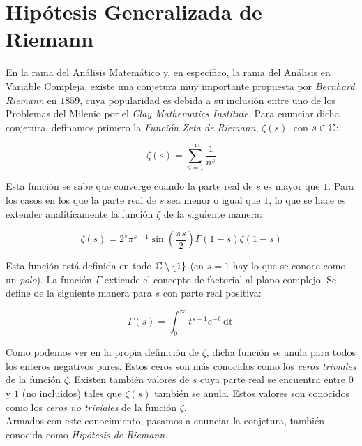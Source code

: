 \section{Hipótesis Generalizada de Riemann}

En la rama del Análisis Matemático y, en específico, la rama del Análisis en Variable Compleja, existe una conjetura muy importante propuesta por \textit{Bernhard Riemann} en $1859$, cuya popularidad es debida a su inclusión entre uno de los Problemas del Milenio por el \textit{Clay Mathematics Institute}. Para enunciar dicha conjetura, definamos primero la \textit{Función Zeta de Riemann}, $\zeta(s)$, con $s \in \mathbb{C}$:

\begin{equation}\label{funcion_zeta_de_riemann}
\zeta(s) = \sum_{n=1}^{\infty}\frac{1}{n^s}
\end{equation}

Esta función se sabe que converge cuando la parte real de $s$ es mayor que $1$. Para los casos en los que la parte real de $s$ sea menor o igual que $1$, lo que se hace es extender analíticamente la función $\zeta$ de la siguiente manera:

\begin{equation}\label{funcion_zeta_de_riemann_extendida}
\zeta(s) = 2^s\pi^{s-1}\sin\left(\frac{\pi s}{2}\right)\Gamma(1-s)\zeta(1-s)
\end{equation}

Esta función está definida en todo $\mathbb{C} \setminus \{1\}$ (en $s = 1$ hay lo que se conoce como un \textit{polo}). La función $\Gamma$ extiende el concepto de factorial al plano complejo. Se define de la siguiente manera para $s$ con parte real positiva:

\begin{equation}
\Gamma(s) = \int_{0}^{\infty}t^{s-1}e^{-t}\mathop{dt}
\end{equation}

Como podemos ver en la propia definición de $\zeta$, dicha función se anula para todos los enteros negativos pares. Estos ceros son más conocidos como los \textit{ceros triviales} de la función $\zeta$. Existen también valores de $s$ cuya parte real se encuentra entre $0$ y $1$ (no incluidos) tales que $\zeta(s)$ también se anula. Estos valores son conocidos como los \textit{ceros no triviales} de la función $\zeta$.\\

Armados con este conocimiento, pasamos a enunciar la conjetura, también conocida como \textit{Hipótesis de Riemann}.

